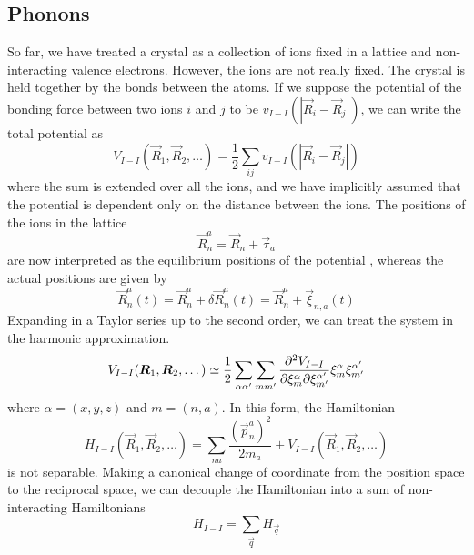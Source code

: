 \subsection{Phonons} \label{sec:phonons}
So far, we have treated a crystal as a collection of ions fixed in a lattice and non-interacting valence electrons. However, the ions are not really fixed. The crystal is held together by the bonds between the atoms. If we suppose the potential of the bonding force between two ions $i$ and $j$ to be $v_{I-I}(|\vec{R}_i - \vec{R}_j|)$, we can write the total potential as
\begin{equation} \label{eq:ion_ion_potential}
    V_{I-I}(\vec{R}_1, \vec{R}_2, \dots) = \frac{1}{2} \sum_{ij} v_{I-I}(|\vec{R}_i - \vec{R}_j|)
\end{equation}
where the sum is extended over all the ions, and we have implicitly assumed that the potential is dependent only on the distance between the ions. The positions of the ions in the lattice
\begin{equation}
    \vec{R}_n^a = \vec{R}_n + \vec{\tau}_a
\end{equation}
are now interpreted as the equilibrium positions of the potential , whereas the actual positions are given by
\begin{equation} \label{eq:atom_position_perturbed}
    \vec{R}_n^a(t) = \vec{R}_n^a + \delta \vec{R}_n^a(t) = \vec{R}_n^a + \vec{\xi}_{n,a}(t)
\end{equation}
Expanding  in a Taylor series up to the second order, we can treat the system in the harmonic approximation.
\begin{equation}
    V_{I-I}(\mathbf{\boldsymbol{R}}_1, \mathbf{\boldsymbol{R}}_2, \dots) \simeq \frac{1}{2} \sum_{\alpha \alpha'} \sum_{m m'} \frac{\partial^2 V_{I-I}}{\partial \xi_m^\alpha \partial \xi_{m'}^{\alpha'}} \xi_m^\alpha \xi_{m'}^{\alpha'}
\end{equation}
where $\alpha = (x,y,z)$ and $m = (n,a)$.
In this form, the Hamiltonian
\begin{equation} \label{eq:lattice_hamiltonian}
    H_{I-I}(\vec{R}_1, \vec{R}_2, \dots) = \sum_{na} \frac{(\vec{p}_n^a)^2}{2m_a} + V_{I-I}(\vec{R}_1, \vec{R}_2, \dots)
\end{equation}
is not separable. Making a canonical change of coordinate from the position space to the reciprocal space, we can decouple the Hamiltonian into a sum of non-interacting Hamiltonians
\begin{equation}
    H_{I-I} = \sum_\vec{q} H_\vec{q}
\end{equation}
